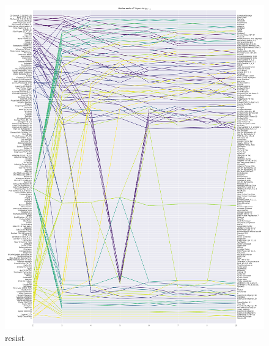 \documentclass{article}
\begin{document}
\begin{figure}[!hbtp]
    \centering
    \includegraphics[height=.9\textheight]{../img/median_rank_vs_population_size_resist.pdf}
    \caption{resist}
    \label{fig:ranks_v_size_resist}
\end{figure}
\end{document}
